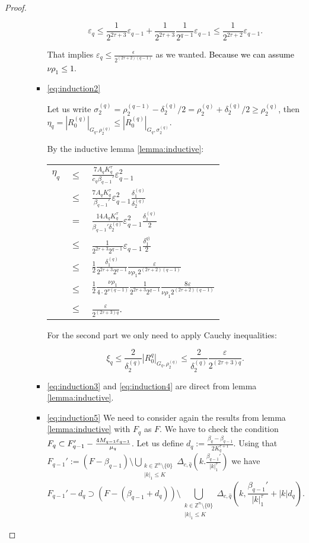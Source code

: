 \begin{proof}
\begin{enumerate}
\begin{itemize}
\begin{itemize}
$$\varepsilon_q \leq \frac{1}{2^{2\tau+3}}\varepsilon_{q-1} + \frac{1}{2^{2\tau+3}}\frac{1}{2^{q-1}}\varepsilon_{q-1} \leq \frac{1}{2^{2\tau+2}}\varepsilon_{q-1}.$$

That implies $\varepsilon_q \leq \frac{\epsilon}{2^{(2\tau+2)(q-1)}}$
as we wanted. \textcolor{black}{Because we can assume $\nu\rho_1 \leq 1$}.

\item \ref{eq:induction2}

Let us write $\sigma_2^{(q)} = \rho_2^{(q-1)} - \delta_2^{(q)}/2 = \rho_2^{(q)} + \delta_2^{(q)}/2 \geq \rho_2^{(q)}$, then $\eta_q = |R_0^{(q)}|_{G_q, \rho_2^{(q)}} \leq |R_0^{(q)}|_{G_q,\sigma_2^{(q)}}$.

By the inductive lemma \ref{lemma:inductive}:

\begin{longtable}{rcl}
 $\eta_q$ & $\leq$ & $\frac{7 A_q K_q^\tau}{c_q \beta_{q-1}'} \varepsilon_{q-1}^2 $\\
 & $\leq$ & $\frac{7 A_q K_q^\tau}{\beta_{q-1}'}\varepsilon_{q-1}^2 \frac{\delta_1^{(q)}}{\delta_2^{(q)}}$\\
 & $=$ & $\frac{14 A_q K_q^\tau}{\beta_{q-1}' \delta_2^{(q)}}\varepsilon_{q-1}^2\frac{\delta_1^{(q)}}{2}$\\
 & $\leq$ & $\frac{1}{2^{2\tau+3}2^{q-1}}\varepsilon_{q-1}\frac{\delta_1^{q)}}{2}$\\
 & $\leq$ & $\frac{1}{2}\frac{\delta_1^{(q)}}{2^{2\tau+3}2^{q-1}}\frac{\varepsilon}{\nu\rho_1 2^{(2\tau+2)(q-1)}}$ \\
 & $\leq$ & $\frac{1}{2}\frac{\nu \rho_1}{4\cdot 2^{\nu(q-1)}}\frac{1}{2^{2\tau+3}2^{q-1}}\frac{8\varepsilon}{\nu\rho_1 2^{(2\tau+2)(q-1)}}$ \\
 & $\leq$ & $\frac{\varepsilon}{2^{(2\tau + 3)q}}$. \\
\end{longtable}

For the second part we only need to apply  Cauchy inequalities:

$$\xi_q \leq \frac{2}{\delta_2^{(q)}} |R_0^{q}|_{G_q,\rho_2^{(q)}} \leq \frac{2}{\delta_2^{(q)}}\frac{\varepsilon}{2^{(2\tau+3)q}}.$$

\item \ref{eq:induction3} and \ref{eq:induction4} are direct from lemma \ref{lemma:inductive}.
\item \ref{eq:induction5} We need to consider again the results from lemma \ref{lemma:inductive} with $F_q$ as $F$.
We have to check the condition $F_q \subset  F_{q-1}' - \textcolor{black}{\frac{4M_{q-1}\varepsilon_{q-1}}{\mu_q}}$.
Let us define $d_q:=\frac{\beta_q - \beta_{q-1}}{2 K_q^{\tau+1}}$.
Using that $F_{q-1}' := (F-\beta_{q-1}) \setminus \bigcup_{\substack{k\in\mathbb{Z}^n\setminus\{0\} \\ |k|_1 \leq K}} \Delta_{c,\hat q}(k.\frac{\beta_{q-1}'}{|k|_1^\tau})$ we have
$$F_{q-1}' - d_q \supset (F-(\beta_{q-1}+d_q))\setminus \bigcup_{\substack{k\in\mathbb{Z}^n\setminus\{0\} \\ |k|_1 \leq K}}\Delta_{c,\hat q}(k,\frac{\beta_{q-1}'}{|k|_1^\tau} + |k|d_q).$$


\end{itemize}
\end{itemize}
\end{enumerate}
\end{proof}
